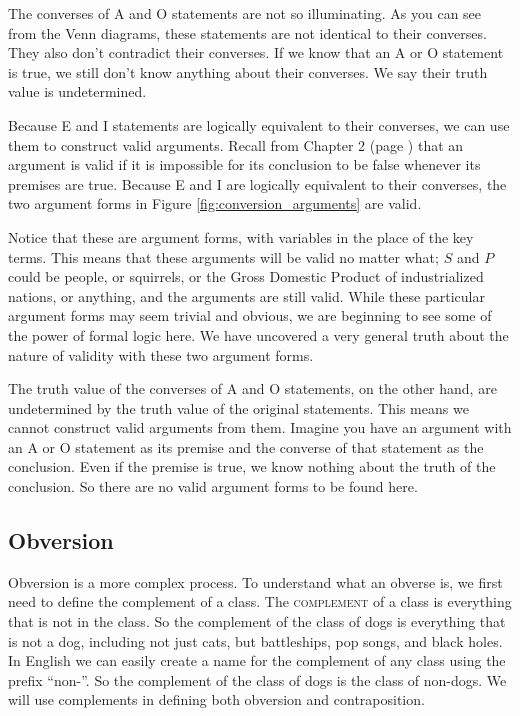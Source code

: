 The converses of A and O statements are not so illuminating. As you can see from the Venn diagrams, these statements are not identical to their converses. They also don't contradict their converses. If we know that an A or O statement is true, we still don't know anything about their converses. We say their truth value is undetermined.

Because E and I statements are logically equivalent to their converses, we can use them to construct valid arguments. Recall from Chapter 2 (page \pageref{def:valid}) that an argument is valid if it is impossible for its conclusion to be false whenever its premises are true. Because E and I are logically equivalent to their converses, the two argument forms in Figure \ref{fig:conversion_arguments} are valid.


\begin{kormanize}
\end{kormanize}


\begin{kormanize}
\end{kormanize}

Notice that these are argument forms, with variables in the place of the key terms. This means that these arguments will be valid no matter what; $S$ and $P$ could be people, or squirrels, or the Gross Domestic Product of industrialized nations, or anything, and the arguments are still valid. While these particular argument forms may seem trivial and obvious, we are beginning to see some of the power of formal logic here. We have uncovered a very general truth about the nature of validity with these two argument forms.

The truth value of the converses of A and O statements, on the other hand, are undetermined by the truth value of the original statements. This means we cannot construct valid arguments from them. Imagine you have an argument with an A or O statement as its premise and the converse of that statement as the conclusion. Even if the premise is true, we know nothing about the truth of the conclusion. So there are no valid argument forms to be found here.

\subsection{Obversion}


Obversion is a more complex process. To understand what an obverse is, we first need to define the complement of a class. The \textsc{\gls{complement}} \label{def:complement} of a class is everything that is not in the class. So the complement of the class of dogs is everything that is not a dog, including not just cats, but battleships, pop songs, and black holes. In English we can easily create a name for the complement of any class using the prefix ``non-''. So the complement of the class of dogs is the class of non-dogs. We will use complements in defining both obversion and contraposition.


